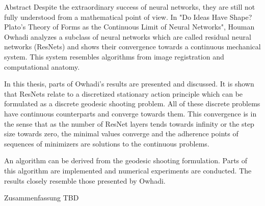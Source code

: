 \begin{polyabstract}{Abstract} 
	Despite the extraordinary success of neural networks, they are still not fully understood from a mathematical point of view.
	In "Do Ideas Have Shape? Plato's Theory of Forms as the Continuous Limit of Neural Networks", Houman Owhadi analyzes a subclass of neural networks which are called residual neural networks (ResNets) and shows their convergence towards a continuous mechanical system.
	This system resembles algorithms from image registration and computational anatomy.
	
	In this thesis, parts of Owhadi's results are presented and discussed.
	It is shown that ResNets relate to a discretized stationary action principle which can be formulated as a discrete geodesic shooting problem.
	All of these discrete problems have continuous counterparts and converge towards them.
	This convergence is in the sense that as the number of ResNet layers tends towards infinity or the step size towards zero, the minimal values converge and the adherence points of sequences of minimizers are solutions to the continuous problems.
	
	An algorithm can be derived from the geodesic shooting formulation.
	Parts of this algorithm are implemented and numerical experiments are conducted.
	The results closely resemble those presented by Owhadi.
	 
	
\end{polyabstract}

\pagebreak
\begin{polyabstract}{Zusammenfassung}
	TBD
\end{polyabstract}
